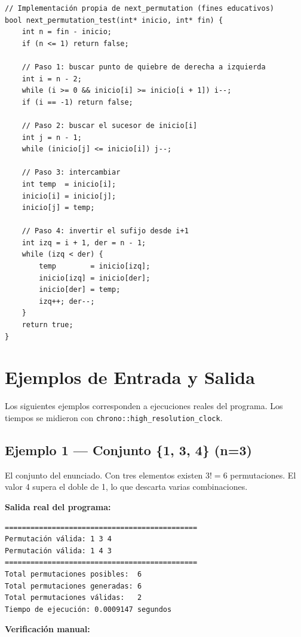\documentclass[12pt, a4paper]{article}
\begin{document}
\begin{lstlisting}[style=cpp, caption={Implementación completa: permutaciones.cpp}]
// Implementación propia de next_permutation (fines educativos)
bool next_permutation_test(int* inicio, int* fin) {
    int n = fin - inicio;
    if (n <= 1) return false;

    // Paso 1: buscar punto de quiebre de derecha a izquierda
    int i = n - 2;
    while (i >= 0 && inicio[i] >= inicio[i + 1]) i--;
    if (i == -1) return false;

    // Paso 2: buscar el sucesor de inicio[i]
    int j = n - 1;
    while (inicio[j] <= inicio[i]) j--;

    // Paso 3: intercambiar
    int temp  = inicio[i];
    inicio[i] = inicio[j];
    inicio[j] = temp;

    // Paso 4: invertir el sufijo desde i+1
    int izq = i + 1, der = n - 1;
    while (izq < der) {
        temp        = inicio[izq];
        inicio[izq] = inicio[der];
        inicio[der] = temp;
        izq++; der--;
    }
    return true;
}
\end{lstlisting}

\section{Ejemplos de Entrada y Salida}

Los siguientes ejemplos corresponden a ejecuciones reales del programa. Los tiempos
se midieron con \texttt{chrono::high\_resolution\_clock}.

\subsection{Ejemplo 1 --- Conjunto \{1, 3, 4\} (n=3)}

El conjunto del enunciado. Con tres elementos existen $3! = 6$ permutaciones.
El valor 4 supera el doble de 1, lo que descarta varias combinaciones.

\textbf{Salida real del programa:}
\begin{lstlisting}[style=pseudo]
=============================================
Permutación válida: 1 3 4
Permutación válida: 1 4 3
=============================================
Total permutaciones posibles:  6
Total permutaciones generadas: 6
Total permutaciones válidas:   2
Tiempo de ejecución: 0.0009147 segundos
\end{lstlisting}

\textbf{Verificación manual:}
\end{document}
